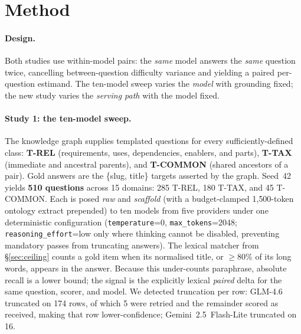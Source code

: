\documentclass[10pt,twocolumn]{article}
\begin{document}
\section{Method}\label{sec:method}
\paragraph{Design.} Both studies use within-model pairs: the \emph{same} model answers the \emph{same} question twice, cancelling between-question difficulty variance and yielding a paired per-question estimand. The ten-model sweep varies the \emph{model} with grounding fixed; the new study varies the \emph{serving path} with the model fixed.

\paragraph{Study 1: the ten-model sweep.} The knowledge graph supplies templated questions for every sufficiently-defined class: \textbf{T-REL} (requirements, uses, dependencies, enablers, and parts), \textbf{T-TAX} (immediate and ancestral parents), and \textbf{T-COMMON} (shared ancestors of a pair). Gold answers are the \{slug, title\} targets asserted by the graph. Seed~42 yields \textbf{510 questions} across 15 domains: 285 T-REL, 180 T-TAX, and 45 T-COMMON. Each is posed \emph{raw} and \emph{scaffold} (with a budget-clamped 1{,}500-token ontology extract prepended) to ten models from five providers under one deterministic configuration (\texttt{temperature}=0, \texttt{max\_tokens}=2048; \texttt{reasoning\_effort}=low only where thinking cannot be disabled, preventing mandatory passes from truncating answers). The lexical matcher from \S\ref{sec:ceiling} counts a gold item when its normalised title, or $\geq80\%$ of its long words, appears in the answer. Because this under-counts paraphrase, absolute recall is a lower bound; the signal is the explicitly lexical \emph{paired} delta for the same question, scorer, and model. We detected truncation per row: GLM-4.6 truncated on 174 rows, of which 5 were retried and the remainder scored as received, making that row lower-confidence; Gemini~2.5~Flash-Lite truncated on 16.
\end{document}
